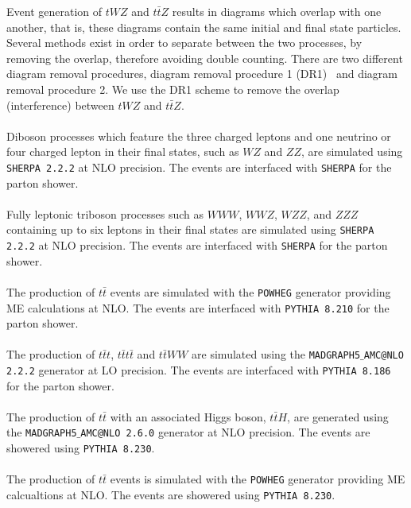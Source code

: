 Event generation of $tWZ$ and $t\bar{t}Z$ results in diagrams which overlap with one another, that is, these diagrams contain the same initial and final state particles. Several methods exist in order to separate between the two processes, by removing the overlap, therefore avoiding double counting. There are two different diagram removal procedures, diagram removal procedure 1 (DR1)~\cite{Demartin:2016axk} and diagram removal procedure 2. We use the DR1 scheme to remove the overlap (interference) between $tWZ$ and $t\bar{t}Z$.\\\\

Diboson processes which feature the three charged leptons and one neutrino or four charged lepton in their final states, such as $WZ$ and $ZZ$, are simulated using \texttt{SHERPA 2.2.2} at NLO precision. The events are interfaced with \texttt{SHERPA} for the parton shower.\\\\

Fully leptonic triboson processes such as $WWW$, $WWZ$, $WZZ$, and $ZZZ$ containing up to six leptons in their final states are simulated using \texttt{SHERPA 2.2.2} at NLO precision. The events are interfaced with \texttt{SHERPA} for the parton shower.\\\\

The production of $t\bar{t}$ events are simulated with the \texttt{POWHEG} generator providing ME calculations at NLO. The events are interfaced with \texttt{PYTHIA 8.210} for the parton shower.\\\\

The production of $t\bar{t}t$, $t\bar{t}t\bar{t}$ and $t\bar{t}WW$ are simulated using the \texttt{MADGRAPH5$\_$AMC@NLO 2.2.2} generator at LO precision. The events are interfaced with \texttt{PYTHIA 8.186} for the parton shower.\\\\

The production of $t\bar{t}$ with an associated Higgs boson, $t\bar{t}H$, are generated using the \texttt{MADGRAPH5$\_$AMC@NLO 2.6.0} generator at NLO precision. The events are showered using \texttt{PYTHIA 8.230}.\\\\

The production of $t\bar{t}$ events is simulated with the \texttt{POWHEG} generator providing ME calcualtions at NLO. The events are showered using \texttt{PYTHIA 8.230}.\\\\

